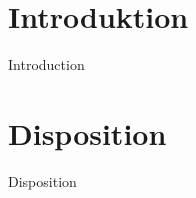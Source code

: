 \section*{Introduktion}
\begin{frame}{Introduction}





\end{frame}


\section*{Disposition}
\begin{frame}{Disposition}





\end{frame}
